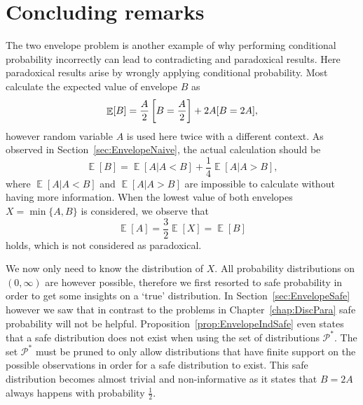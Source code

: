 \documentclass[a4paper]{report}
\theoremstyle{plain}
\theoremstyle{definition}
\theoremstyle{remark}
\numberwithin{equation}{chapter}
\let\P\relax
\DeclareMathOperator{\P}{\mathbb{P}}
\DeclareMathOperator{\E}{\mathbb{E}}
\DeclareMathOperator{\1}{\mathbbm{1}}
\newcommand{\Pmod}{\mathcal{P}^*}
\begin{document}
\section{Concluding remarks}\label{sec:EnvelopeConcl}
The two envelope problem is another example of why performing conditional probability incorrectly can lead to contradicting and paradoxical results. Here paradoxical results arise by wrongly applying conditional probability. Most calculate the expected value of envelope $B$ as
\begin{equation}
\E[B]=\frac{A}{2}\P\left[B=\frac{A}{2}\right]+2A\P[B=2A],
\end{equation}
however random variable $A$ is used here twice with a different context. As observed in Section~\ref{sec:EnvelopeNaive}, the actual calculation should be
\begin{equation}
\E[B]=\E[A|A<B]+\frac{1}{4}\E[A|A>B],
\end{equation}
where $\E[A|A<B]$ and $\E[A|A>B]$ are impossible to calculate without having more information. When the lowest value of both envelopes $X=\min\{A,B\}$ is considered, we observe that
\begin{equation}
\E[A]=\frac{3}{2}\E[X]=\E[B]
\end{equation}
holds, which is not considered as paradoxical.

We now only need to know the distribution of $X$. All probability distributions on $(0,\infty)$ are however possible, therefore we first resorted to safe probability in order to get some insights on a `true' distribution. In Section~\ref{sec:EnvelopeSafe} however we saw that in contrast to the problems in Chapter~\ref{chap:DiscPara} safe probability will not be helpful. Proposition~\ref{prop:EnvelopeIndSafe} even states that a safe distribution does not exist when using the set of distributions $\Pmod$. The set $\Pmod$ must be pruned to only allow distributions that have finite support on the possible observations in order for a safe distribution to exist. This safe distribution becomes almost trivial and non-informative as it states that $B=2A$ always happens with probability $\frac{1}{2}$.
\end{document}
